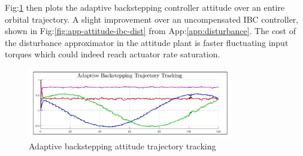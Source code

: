 \par
Fig:\ref{fig:ABC_trajectory} then plots the adaptive backstepping controller attitude over an entire orbital trajectory. A slight improvement over an uncompensated IBC controller, shown in Fig:\ref{fig:app-attitude-ibc-dist} from App:\ref{app:disturbance}. The cost of the disturbance approximator in the attitude plant is faster fluctuating input torques which could indeed reach actuator rate saturation.
\begin{figure}[hbtp]
\vspace{-6pt}
\centering
\includegraphics[width=0.8\textwidth]{graphs/ABC_trajectory}
\caption{Adaptive backstepping attitude trajectory tracking}
\label{fig:ABC_trajectory}
\vspace{-16pt}
\end{figure}
